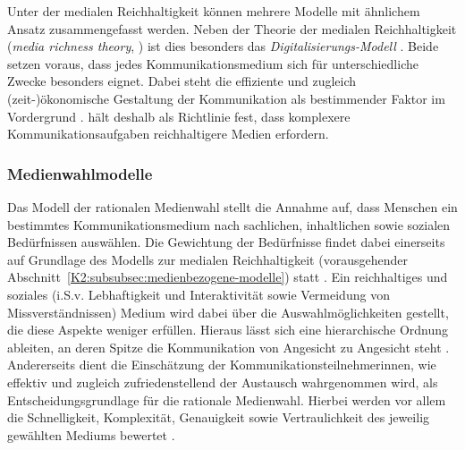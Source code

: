 \label{K2:para:media-richness}
\begin{sloppypar}
Unter der medialen Reichhaltigkeit  können mehrere Modelle mit ähnlichem Ansatz zusammengefasst werden. Neben der Theorie der medialen Reichhaltigkeit (\emph{media richness theory}, \citealt[161]{trepte_medienpsychologie_2012}) ist dies besonders das \emph{Digitalisierungs-Modell} \citep[427]{doring_c_2013}. Beide setzen voraus, dass jedes Kommunikationsmedium sich für unterschiedliche Zwecke besonders eignet. Dabei steht die effiziente und zugleich (zeit-)ökonomische Gestaltung der Kommunikation als bestimmender Faktor im Vordergrund \citep[161]{trepte_medienpsychologie_2012}. \citet[171]{schweiger_sozialkontakte_2019} hält deshalb als Richtlinie fest, dass \glqq komplexere Kommunikationsaufgaben reichhaltigere Medien erfordern\grqq{}.
\end{sloppypar}



\subsubsection{Medienwahlmodelle}
\label{K2:subsubsec:medienwahlmodelle}


\label{K2:para:rationale-medienwahl}
\begin{sloppypar}
Das Modell der rationalen Medienwahl stellt die Annahme auf, dass Menschen ein bestimmtes Kommunikationsmedium nach sachlichen, inhaltlichen sowie sozialen Bedürfnissen auswählen. Die Gewichtung der Bedürfnisse findet dabei einerseits auf Grundlage des Modells zur medialen Reichhaltigkeit (vorausgehender Abschnitt~\ref{K2:subsubsec:medienbezogene-modelle}) statt \citep[96]{misoch_online-kommunikation_2006}. Ein reichhaltiges und soziales (i.S.v. Lebhaftigkeit und Interaktivität sowie Vermeidung von Missverständnissen) Medium wird dabei über die Auswahlmöglichkeiten gestellt, die diese Aspekte weniger erfüllen. Hieraus lässt sich eine hierarchische Ordnung ableiten, an deren Spitze die Kommunikation von Angesicht zu Angesicht steht \citep[425]{doring_c_2013}.
Andererseits dient die Einschätzung der Kommunikationsteilnehmer{\textperiodcentered}innen, wie effektiv und zugleich zufriedenstellend der Austausch wahrgenommen wird, als Entscheidungsgrundlage für die rationale Medienwahl. Hierbei werden vor allem die Schnelligkeit, Komplexität, Genauigkeit sowie Vertraulichkeit des jeweilig gewählten Mediums bewertet \citep[96]{misoch_online-kommunikation_2006}.
\end{sloppypar}


